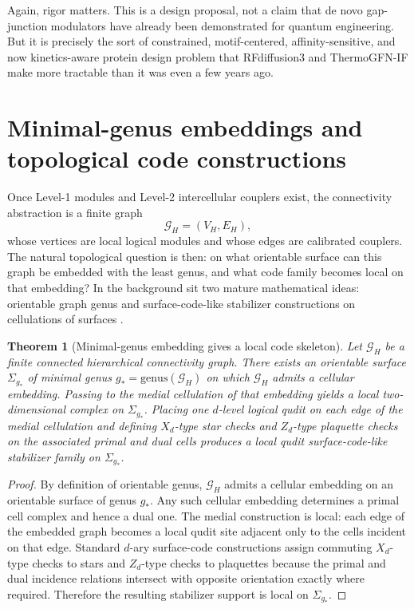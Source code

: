 \documentclass[11pt]{report}
\newcommand{\genusop}{\mathrm{genus}}
\newcommand{\Graph}{\mathcal{G}}
\newcommand{\Surface}{\Sigma}
\newtheorem{theorem}{Theorem}[chapter]
\theoremstyle{definition}
\begin{document}
Again, rigor matters. This is a design proposal, not a claim that de novo gap-junction modulators have already been demonstrated for quantum engineering. But it is precisely the sort of constrained, motif-centered, affinity-sensitive, and now kinetics-aware protein design problem that RFdiffusion3 and ThermoGFN-IF make more tractable than it was even a few years ago.

\section{Minimal-genus embeddings and topological code constructions}
Once Level-1 modules and Level-2 intercellular couplers exist, the connectivity abstraction is a finite graph
\[
\Graph_H = (V_H,E_H),
\]
whose vertices are local logical modules and whose edges are calibrated couplers. The natural topological question is then: on what orientable surface can this graph be embedded with the least genus, and what code family becomes local on that embedding? In the background sit two mature mathematical ideas: orientable graph genus and surface-code-like stabilizer constructions on cellulations of surfaces \cite{graphembedding1987,kitaev2003,quditsurface2007}.

\begin{theorem}[Minimal-genus embedding gives a local code skeleton]
\label{thm:genus}
Let $\Graph_H$ be a finite connected hierarchical connectivity graph. There exists an orientable surface $\Surface_{g_*}$ of minimal genus $g_*=\genusop(\Graph_H)$ on which $\Graph_H$ admits a cellular embedding. Passing to the medial cellulation of that embedding yields a local two-dimensional complex on $\Surface_{g_*}$. Placing one $d$-level logical qudit on each edge of the medial cellulation and defining $X_d$-type star checks and $Z_d$-type plaquette checks on the associated primal and dual cells produces a local qudit surface-code-like stabilizer family on $\Surface_{g_*}$.
\end{theorem}

\begin{proof}
By definition of orientable genus, $\Graph_H$ admits a cellular embedding on an orientable surface of genus $g_*$. Any such cellular embedding determines a primal cell complex and hence a dual one. The medial construction is local: each edge of the embedded graph becomes a local qudit site adjacent only to the cells incident on that edge. Standard $d$-ary surface-code constructions assign commuting $X_d$-type checks to stars and $Z_d$-type checks to plaquettes because the primal and dual incidence relations intersect with opposite orientation exactly where required. Therefore the resulting stabilizer support is local on $\Surface_{g_*}$.
\end{proof}
\end{document}
